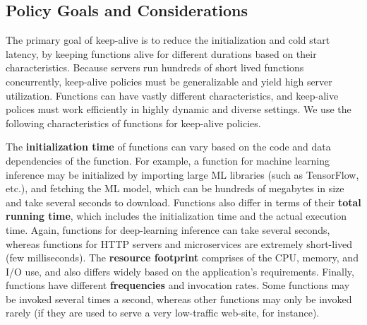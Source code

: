 \subsection{Policy Goals and Considerations}
\vspace*{\subsecspace}


The primary goal of keep-alive is to reduce the initialization and cold start latency, by keeping functions alive for different durations based on their characteristics. 
Because servers run hundreds of short lived functions concurrently, keep-alive policies must be generalizable and yield high server utilization. 
Functions can have vastly different characteristics, and keep-alive polices must work efficiently in highly dynamic and diverse settings. %
We use the following characteristics of functions for keep-alive policies.


The \textbf{initialization time} of functions can vary based on the code and data dependencies of the function.  
For example, a function for machine learning inference may be initialized by importing large ML libraries (such as TensorFlow, etc.), and fetching the ML model, which can be hundreds of megabytes in size and take several seconds to download. 
Functions also differ in terms of their \textbf{total running time}, which includes the initialization time and the actual execution time. 
Again, functions for deep-learning inference can take several seconds, whereas functions for HTTP servers and microservices are extremely short-lived (few milliseconds). 
The \textbf{resource footprint} comprises of the CPU, memory, and I/O use, and also differs widely based on the application's requirements. 
Finally, functions have different \textbf{frequencies} and invocation rates. Some functions may be invoked several times a second, whereas other functions may only be invoked rarely (if they are used to serve a very low-traffic web-site, for instance). 



